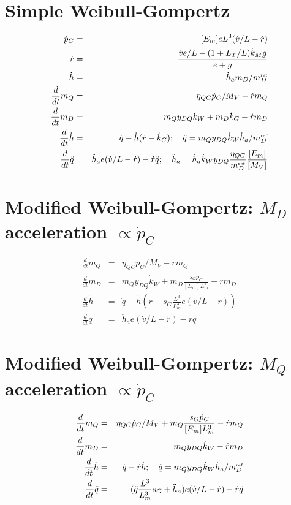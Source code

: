 \documentclass[12pt]{article}
\begin{document}
\section*{Simple Weibull-Gompertz}

\begin{eqnarray}
  \dot{p}_C &=& [E_m] e L^3 (\dot{v}/ L - \dot{r})
\\
  \dot{r} &=&\frac{\dot{v} e/ L - (1 + L_T/ L) \dot{k}_M g} {e + g}
\\
  \dot{h} &=& \dot{h}_a m_D/ m_D^{\mbox{\tiny ref}}
\\
  \frac{d} {dt} m_Q &=& \eta_{QC} \dot{p}_C/ M_V - \dot{r} m_Q
\\
  \frac{d} {dt} m_D &=& 
   m_Q y_{DQ} \dot{k}_W + m_D \dot{k}_G - \dot{r} m_D
\\
  \frac{d} {dt} \dot{h} &=& \ddot{q} -
    \dot{h} (\dot{r} - \dot{k}_G); \quad 
  \ddot{q} = m_Q y_{DQ} \dot{k}_W \dot{h}_a/ m_D^{\mbox{\tiny ref}} 
\\
  \frac{d} {dt} \ddot{q} &=& \ddot{h}_a e (\dot{v}/ L - \dot{r})
    - \dot{r} \ddot{q}; \quad 
  \ddot{h}_a = \dot{h}_a \dot{k}_W y_{DQ} \frac{\eta_{QC}} {m_D^{\mbox{\tiny ref}}}
  \frac{[E_m]} {[M_V]}
\end{eqnarray}

\section*{Modified Weibull-Gompertz: $M_D$ acceleration $\propto \dot{p}_C$}

\begin{eqnarray}
  \frac{d} {dt} m_Q &=& \eta_{QC} \dot{p}_C/ M_V - \dot{r} m_Q
\\
  \frac{d} {dt} m_D &=& 
   m_Q y_{DQ} \dot{k}_W + 
   m_D \frac{s_G \dot{p}_C} {[E_m] L_m^3} - \dot{r} m_D
\\
  \frac{d} {dt} \dot{h} &=& \ddot{q} - \dot{h} (\dot{r} - 
  s_G \frac{L^3} {L_m^3} e (\dot{v}/ L - \dot{r}))
\\
  \frac{d} {dt} \ddot{q} &=& \ddot{h}_a e (\dot{v}/ L - \dot{r})
    - \dot{r} \ddot{q}
\end{eqnarray}


\section*{Modified Weibull-Gompertz: $M_Q$ acceleration $\propto \dot{p}_C$}

\begin{eqnarray}
  \frac{d} {dt} m_Q &=& \eta_{QC} \dot{p}_C/ M_V + 
  m_Q \frac{s_G \dot{p}_C} {[E_m] L_m^3} - \dot{r} m_Q
\\
  \frac{d} {dt} m_D &=& m_Q y_{DQ} \dot{k}_W - \dot{r} m_D
\\
  \frac{d} {dt} \dot{h} &=& \ddot{q} - \dot{r} \dot{h}; \quad 
  \ddot{q} = m_Q y_{DQ} \dot{k}_W \dot{h}_a/ m_D^{\mbox{\tiny ref}} 
\\
  \frac{d} {dt} \ddot{q} &=& (\ddot{q} \frac{L^3} {L_m^3} s_G + \ddot{h}_a) 
    e (\dot{v}/ L - \dot{r}) - \dot{r} \ddot{q}
\end{eqnarray}
\end{document}
